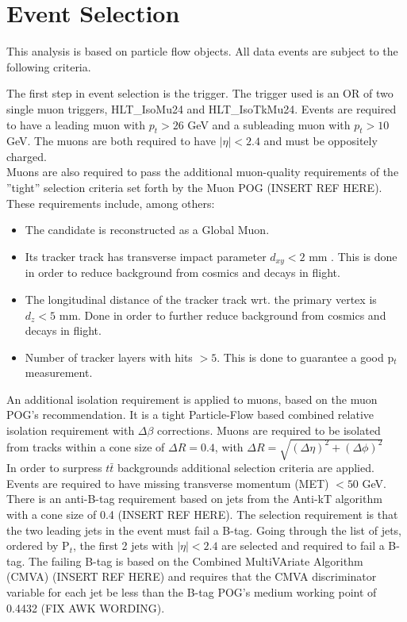 \documentclass[
10pt, %
a4paper, %
oneside, %
headinclude,footinclude, %
BCOR5mm, %
]{scrartcl}
\begin{document}
\section{Event Selection}

This analysis is based on particle flow objects. All data events are subject to the following criteria.

The first step in event selection is the trigger. The trigger used is an OR of two single muon triggers, HLT\_IsoMu24 and HLT\_IsoTkMu24. 
Events are required to have a leading muon with $p_t > 26$ GeV and a subleading muon with $p_t > 10$ GeV. The muons are both required 
to have $|\eta| < 2.4$ and must be oppositely charged. \\

Muons are also required to pass the additional muon-quality requirements of the ''tight'' selection 
criteria set forth by the Muon POG (INSERT REF HERE). These requirements include, among others: \\

\begin{itemize}
    \item The candidate is reconstructed as a Global Muon. 
    \item Its tracker track has transverse impact parameter $d_{xy} < 2 $ mm . 
        This is done in order to reduce background from cosmics and decays in flight. 
    \item The longitudinal distance of the tracker track wrt. the primary vertex is $d_{z} < 5 $ mm.
        Done in order to further reduce background from cosmics and decays in flight.
    \item Number of tracker layers with hits $> 5$. This is done to guarantee a good p$_{t}$ measurement.
\end{itemize}

An additional isolation requirement is applied to muons, based on the muon POG's recommendation. 
It is a tight Particle-Flow based combined relative isolation requirement with $\Delta \beta$ corrections.
Muons are required to be isolated from tracks within a cone size of $\Delta R = 0.4$, with 
$\Delta R = \sqrt{(\Delta \eta)^{2} + (\Delta \phi)^2}$\\

In order to surpress $t \bar{t}$ backgrounds additional selection criteria are applied. 
Events are required to have missing transverse momentum (MET) $ < 50 $ GeV.
There is an anti-B-tag requirement based on jets from the Anti-kT 
algorithm with a cone size of 0.4 (INSERT REF HERE). 
The selection requirement is that the two leading jets in the event must fail a B-tag. 
Going through the list of jets, ordered by P$_t$, the first 2 jets with $|\eta| < 2.4$ are selected and required to fail a B-tag. 
The failing B-tag is based on the Combined MultiVAriate Algorithm (CMVA) (INSERT REF HERE) and requires that the CMVA discriminator variable for each jet 
be less than the B-tag POG's medium working point of 0.4432 (FIX AWK WORDING). \\
\end{document}

